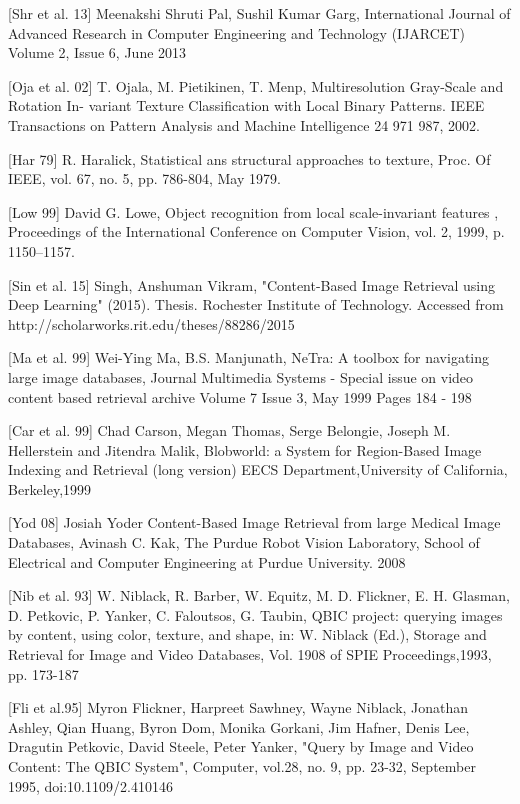 [Shr et al. 13] Meenakshi Shruti Pal, Sushil Kumar Garg,  International Journal of Advanced Research in Computer Engineering and Technology (IJARCET) Volume 2, Issue 6, June 2013

[Oja et al. 02] T. Ojala, M. Pietikinen, T. Menp, Multiresolution Gray-Scale and Rotation In-
variant Texture Classification with Local Binary Patterns. IEEE Transactions on
Pattern Analysis and Machine Intelligence 24 971 987, 2002.

[Har 79] R. Haralick, Statistical ans structural approaches to texture, Proc. Of IEEE, vol.
67, no. 5, pp. 786-804, May 1979.

[Low 99] David G. Lowe, Object recognition from local scale-invariant features , Proceedings of the International Conference on Computer Vision, vol. 2,‎ 1999, p. 1150–1157.

[Sin et al. 15] Singh, Anshuman Vikram, "Content-Based Image Retrieval using Deep Learning" (2015). Thesis. Rochester Institute of Technology.  Accessed from http://scholarworks.rit.edu/theses/88286/2015

[Ma et al. 99] Wei-Ying Ma, B.S. Manjunath, NeTra: A toolbox for navigating large image databases, Journal
Multimedia Systems - Special issue on video content based retrieval archive Volume 7 Issue 3, May 1999 Pages 184 - 198 

[Car et al. 99] Chad Carson, Megan Thomas, Serge Belongie, Joseph M. Hellerstein and Jitendra Malik, Blobworld: a System for Region-Based Image Indexing and Retrieval (long version) EECS Department,University of California, Berkeley,1999


[Yod 08] Josiah Yoder Content-Based Image Retrieval from large Medical Image Databases, Avinash C. Kak, The Purdue Robot Vision Laboratory, School of Electrical and Computer Engineering at Purdue University. 2008

[Nib et al. 93] W. Niblack, R. Barber, W. Equitz, M. D. Flickner, E. H. Glasman, D. Petkovic, P. Yanker, C. Faloutsos, G. Taubin, QBIC project: querying images by content, using color, texture, and shape, in: W. Niblack (Ed.), Storage and Retrieval for Image and Video Databases, Vol. 1908 of SPIE Proceedings,1993, pp. 173-187

[Fli et al.95] Myron Flickner, Harpreet Sawhney, Wayne Niblack, Jonathan Ashley, Qian Huang, Byron Dom, Monika Gorkani, Jim Hafner, Denis Lee, Dragutin Petkovic, David Steele, Peter Yanker, "Query by Image and Video Content: The QBIC System", Computer, vol.28, no. 9, pp. 23-32, September 1995, doi:10.1109/2.410146

